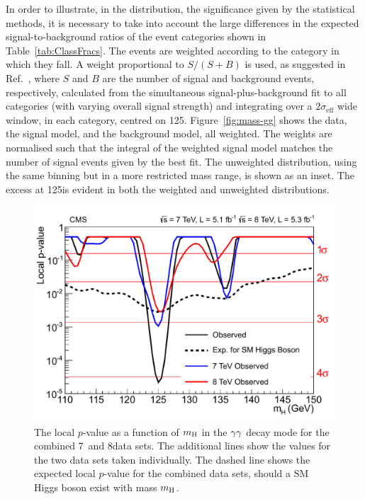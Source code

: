 \documentclass[11pt,twoside,a4paper,cmspaper,final]{cms-tdr}
\begin{document}
In order to illustrate, in the \mgg distribution, the significance given by the statistical methods,
it is necessary to take into account the large
differences in the expected signal-to-background ratios of the event
categories shown in Table~\ref{tab:ClassFracs}.
The events are weighted according to the category in which they fall.
A weight proportional to $S/(S+B)$ is used, as
suggested in Ref.~\cite{Barlow:1986ek},
where $S$ and $B$ are the number of signal and background events,
respectively, calculated from the simultaneous signal-plus-background fit to all
categories (with varying overall signal strength) and integrating over a $2\sigma_\text{eff}$ wide window, in each category,
centred on 125\GeV.
Figure~\ref{fig:mass-gg} shows the data, the signal
model, and the background model, all weighted.
The weights are
normalised such that the integral of the weighted signal model matches
the number of signal events given by the best fit.
The unweighted distribution, using the same binning but in a more
restricted mass range, is shown as an inset.
The excess at 125\GeV is evident in both the weighted and unweighted distributions.



\begin{figure}[htbp]
   \begin{center}
     \includegraphics[width=\cmsFigWideWidth]{pvaluescombPaper}
     \caption{\label{fig:p-value-gg} The local $p$-value as a function
       of $m_{\mathrm{H}}$ in the $\gamma\gamma$ decay mode for the combined 7~and 8\TeV data sets. The
       additional lines show the values for the two data sets taken
       individually.
The dashed line shows the expected local $p$-value for the combined
data sets, should a SM Higgs boson exist with mass $m_{\mathrm{H}}$.
}
   \end{center}
\end{figure}
\end{document}
